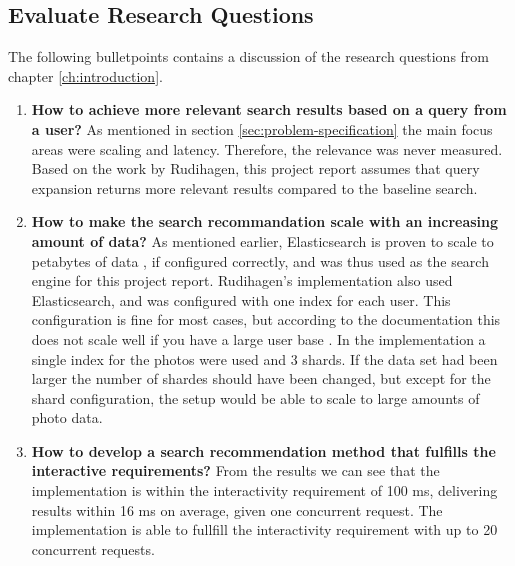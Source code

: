 \subsection{Evaluate Research Questions}
The following bulletpoints contains a discussion of the research questions from chapter \ref{ch:introduction}.

\begin{enumerate}
  \item \textbf{How to achieve more relevant search results based on a query from a user?} \newline
  As mentioned in section \ref{sec:problem-specification} the main focus areas were scaling and latency.
  Therefore, the relevance was never measured.
  Based on the work by Rudihagen,
  this project report assumes that query expansion returns more relevant results compared to the baseline search.

  \item\label{rq:scaling} \textbf{How to make the search recommandation scale with an increasing amount of data?} \newline
  As mentioned earlier, Elasticsearch is proven to scale to petabytes of data \cite{elasticsearch-scale},
  if configured correctly, and was thus used as the search engine for this project report.
  Rudihagen's implementation also used Elasticsearch, and was configured with one index for each user.
  This configuration is fine for most cases, but according to the documentation this does not scale well if you have a large user base \cite{elasticsearch-indices}.
  In the implementation a single index for the photos were used and 3 shards.
  If the data set had been larger the number of shardes should have been changed,
  but except for the shard configuration, the setup would be able to scale to large amounts of photo data.

  \item\label{rq:latency} \textbf{How to develop a search recommendation method that fulfills the interactive requirements?} \newline
  From the results we can see that the implementation is within the interactivity requirement of 100 ms, delivering results within 16 ms on average, given one concurrent request.
  The implementation is able to fullfill the interactivity requirement with up to 20 concurrent requests.
\end{enumerate}
